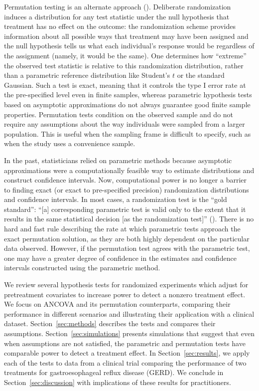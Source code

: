 \documentclass[12pt]{article}
\begin{document}
Permutation testing is an alternate approach (\cite{fisher_design_1935, pitman_significance_1937,pitman_significance_1938}).
Deliberate randomization induces a distribution for any test statistic under the null hypothesis that treatment has no effect on the outcome:
the randomization scheme provides information about all possible ways that treatment may have been assigned 
and the null hypothesis tells us what each individual's response would be regardless of the assignment (namely, it would be the same).
One determines how ``extreme'' the observed test statistic is relative to this randomization distribution, rather than a parametric reference distribution like Student's $t$ or the standard Gaussian.
Such a test is exact, meaning that it controls the type I error rate at the pre-specified level even in finite samples, whereas parametric hypothesis tests based on asymptotic approximations do not always guarantee good finite sample properties.
Permutation tests condition on the observed sample and do not require any assumptions about the way individuals were sampled from a larger population.
This is useful when the sampling frame is difficult to specify, such as when the study uses a convenience sample.

In the past, statisticians relied on parametric methods because asymptotic approximations were a computationally feasible way to estimate distributions and construct confidence intervals.
Now, computational power is no longer a barrier to finding exact (or exact to pre-specified precision) randomization distributions and confidence intervals.
In most cases, a randomization test is the ``gold standard'':
``[a] corresponding parametric test is valid only to the extent that it results in the same statistical decision [as the randomization test]'' (\cite{bradley_distribution_1968}).
There is no hard and fast rule describing the rate at which parametric tests approach the exact permutation solution, as they are both highly dependent on the particular data observed.
However, if the permutation test agrees with the parametric test, one may have a greater degree of confidence in the estimates and confidence intervals constructed using the parametric method.

We review several hypothesis tests for randomized experiments which adjust for pretreatment covariates to increase power to detect a nonzero treatment effect.  
We focus on ANCOVA and its permutation counterparts, comparing their performance in different scenarios and illustrating their application with a clinical dataset.
Section~\ref{sec:methods} describes the tests and compares their assumptions.
Section~\ref{sec:simulations} presents simulations that suggest that even when assumptions are not satisfied, the parametric and permutation tests have comparable power to detect a treatment effect.
In Section~\ref{sec:results}, we apply each of the tests to data from a clinical trial comparing the performance of two treatments for gastroesophageal reflux disease (GERD).
We conclude in Section~\ref{sec:discussion} with implications of these results for practitioners.
\end{document}
